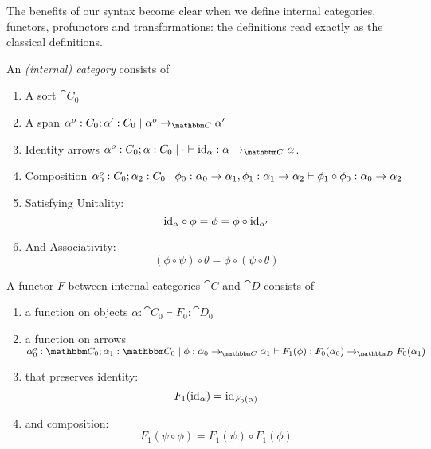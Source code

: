 \documentclass{article}
\begin{document}
The benefits of our syntax become clear when we define internal
categories, functors, profunctors and transformations: the definitions
read exactly as the classical definitions.
\begin{definition}
  An \emph{(internal) category} consists of
  \begin{enumerate}
  \item A sort $\cat C_0$
  \item A span $\alpha^o:C_0;\alpha' : C_0 \pipe \alpha^o \to_{\cat C} \alpha'$
  \item Identity arrows $\alpha^o : C_0; \alpha : C_0 \pipe \cdot
    \vdash \id_{\alpha} : \alpha \to_{\cat C} \alpha$.
  \item Composition $\alpha_0^o:C_0;\alpha_2:C_0\mathrel{|} \phi_0 :
    \alpha_0 \to \alpha_1, \phi_1 : \alpha_1 \to \alpha_2 \vdash
    \phi_1 \circ \phi_0 : \alpha_0 \to \alpha_2$
  \item Satisfying Unitality:
    \[ \textrm{id}_{\alpha} \circ \phi = \phi = \phi \circ \textrm{id}_{\alpha'}\]
  \item And Associativity:
    \[ (\phi \circ \psi) \circ \theta = \phi \circ (\psi \circ \theta) \]
  \end{enumerate}
\end{definition}

\begin{definition}
  A functor $F$ between internal categories $\cat C$ and $\cat D$ consists of
  \begin{enumerate}
  \item a function on objects $\alpha : \cat C_0 \vdash F_0 : \cat D_0$
  \item a function on arrows $\alpha_0^o : \cat C_0; \alpha_1 : \cat C_0\pipe \phi:\alpha_0 \to_{\cat C} \alpha_1 \vdash F_1(\phi) : F_0(\alpha_0) \to_{\cat D} F_0(\alpha_1)$
  \item that preserves identity:
    \[ F_1(\textrm{id}_{\alpha}) = \textrm{id}_{F_0(\alpha)}\]
  \item and composition:
    \[ F_1(\psi \circ \phi) = F_1(\psi) \circ F_1(\phi) \]
  \end{enumerate}
\end{definition}
\end{document}
